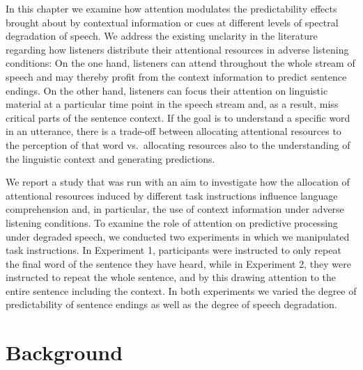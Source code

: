 \documentclass[a4paper, nobind]{templates/ociamthesis}
\begin{document}
In this chapter we examine how attention modulates the predictability effects brought about by contextual information or cues at different levels of spectral degradation of speech.
We address the existing unclarity in the literature regarding how listeners distribute their attentional resources in adverse listening conditions:
On the one hand, listeners can attend throughout the whole stream of speech and may thereby profit from the context information to predict sentence endings.
On the other hand, listeners can focus their attention on linguistic material at a particular time point in the speech stream and, as a result, miss critical parts of the sentence context.
If the goal is to understand a specific word in an utterance, there is a trade-off between allocating attentional resources to the perception of that word vs.~allocating resources also to the understanding of the linguistic context and generating predictions.

We report a study that was run with an aim to investigate how the allocation of attentional resources induced by different task instructions influence language comprehension and, in particular, the use of context information under adverse listening conditions.
To examine the role of attention on predictive processing under degraded speech, we conducted two experiments in which we manipulated task instructions.
In Experiment 1, participants were instructed to only repeat the final word of the sentence they have heard,
while in Experiment 2, they were instructed to repeat the whole sentence, and by this drawing attention to the entire sentence including the context.
In both experiments we varied the degree of predictability of sentence endings as well as the degree of speech degradation.

\hypertarget{background-1}{%
\section{Background}\label{background-1}}
\end{document}
